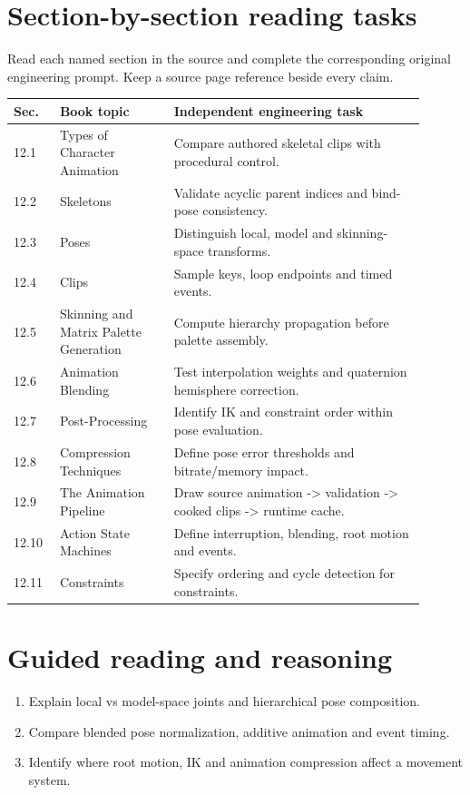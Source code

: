 \documentclass[11pt,letterpaper]{article}
\begin{document}
\section{Section-by-section reading tasks}
Read each named section in the source and complete the corresponding original engineering prompt. Keep a source page reference beside every claim.
\small\begin{longtable}{|p{0.10\linewidth}|p{0.25\linewidth}|p{0.55\linewidth}|}
\hline \textbf{Sec.} & \textbf{Book topic} & \textbf{Independent engineering task} \\ \hline\endhead
12.1 & Types of Character Animation & Compare authored skeletal clips with procedural control. \\ \hline
12.2 & Skeletons & Validate acyclic parent indices and bind-pose consistency. \\ \hline
12.3 & Poses & Distinguish local, model and skinning-space transforms. \\ \hline
12.4 & Clips & Sample keys, loop endpoints and timed events. \\ \hline
12.5 & Skinning and Matrix Palette Generation & Compute hierarchy propagation before palette assembly. \\ \hline
12.6 & Animation Blending & Test interpolation weights and quaternion hemisphere correction. \\ \hline
12.7 & Post-Processing & Identify IK and constraint order within pose evaluation. \\ \hline
12.8 & Compression Techniques & Define pose error thresholds and bitrate/memory impact. \\ \hline
12.9 & The Animation Pipeline & Draw source animation -> validation -> cooked clips -> runtime cache. \\ \hline
12.10 & Action State Machines & Define interruption, blending, root motion and events. \\ \hline
12.11 & Constraints & Specify ordering and cycle detection for constraints. \\ \hline
\end{longtable}\normalsize
\section{Guided reading and reasoning}
\begin{enumerate}
\item Explain local vs model-space joints and hierarchical pose composition.
\item Compare blended pose normalization, additive animation and event timing.
\item Identify where root motion, IK and animation compression affect a movement system.
\end{enumerate}
\end{document}
